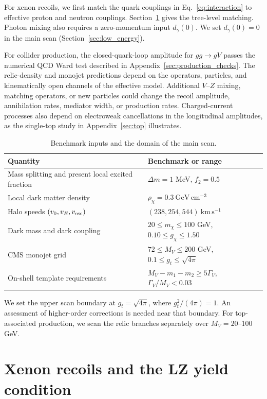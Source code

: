 \documentclass[aps,prd,reprint,superscriptaddress,longbibliography,floatfix]{revtex4-2}
\begin{document}
For xenon recoils, we first match the quark couplings in Eq.~\eqref{eq:interaction} to effective proton and neutron couplings. Section~\ref{sec:recoils} gives the tree-level matching. Photon mixing also requires a zero-momentum input $d_\gamma(0)$. We set $d_\gamma(0)=0$ in the main scan (Section~\ref{sec:low_energy}).

For collider production, the closed-quark-loop amplitude for $gg\to gV$ passes the numerical QCD Ward test described in Appendix~\ref{sec:production_checks}. The relic-density and monojet predictions depend on the operators, particles, and kinematically open channels of the effective model. Additional $V$--$Z$ mixing, matching operators, or new particles could change the recoil amplitude, annihilation rates, mediator width, or production rates. Charged-current processes also depend on electroweak cancellations in the longitudinal amplitudes, as the single-top study in Appendix~\ref{sec:top} illustrates. \cite{kahlhoefer2016,deramo2016}

\begin{table}[tbp]
\caption{Benchmark inputs and the domain of the main scan.}
\label{tab:inputs}
\begin{ruledtabular}
\begin{tabular}{ll}
Quantity & Benchmark or range \\
\hline
Mass splitting and present local excited fraction & $\Delta m=1$ MeV, $f_2=0.5$ \\
Local dark matter density & $\rho_\chi=0.3\ \mathrm{GeV\,cm^{-3}}$ \\
Halo speeds $(v_0,v_E,v_{\rm esc})$ & $(238,254,544)\ \mathrm{km\,s^{-1}}$ \\
Dark mass and dark coupling & $20\le m_\chi\le100$ GeV, $0.10\le g_\chi\le1.50$ \\
CMS monojet grid & $72\le M_V\le200$ GeV, $0.1\le g_t\le\sqrt{4\pi}$ \\
On-shell template requirements & $M_V-m_1-m_2\ge5\Gamma_V$, $\Gamma_V/M_V<0.03$ \\
\end{tabular}
\end{ruledtabular}
\end{table}

We set the upper scan boundary at $g_t=\sqrt{4\pi}$, where $g_t^2/(4\pi)=1$. An assessment of higher-order corrections is needed near that boundary. For top-associated production, we scan the relic branches separately over $M_V=20$--100 GeV.

\section{Xenon recoils and the LZ yield condition}
\label{sec:recoils}
\end{document}
